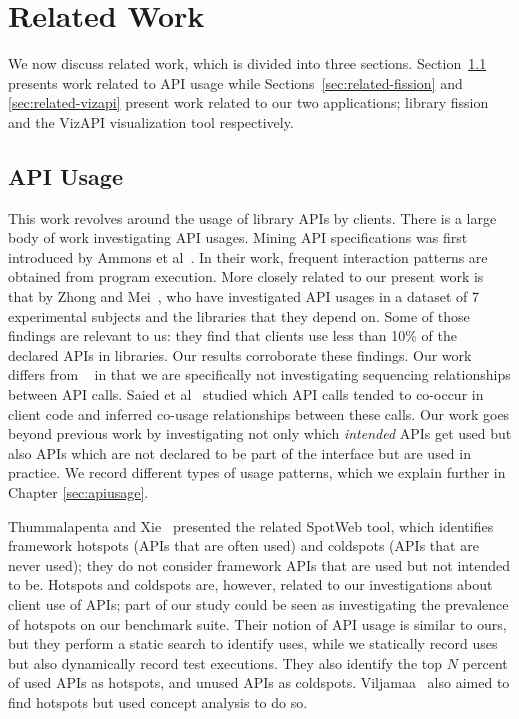 \chapter{Related Work}
\label{sec:related}
We now discuss related work, which is divided into three sections. Section~\ref{sec:related-api} presents work related to API usage while Sections~\ref{sec:related-fission} and \ref{sec:related-vizapi} present work related to our two applications; library fission and the VizAPI visualization tool respectively.

\section{API Usage}
\label{sec:related-api}
This work revolves around the usage of library APIs by clients. There is a large body of work investigating API usages. Mining API specifications was first introduced by Ammons et al~\cite{AmmonsETAL02MiningSpecifications}. In their work, frequent interaction patterns are obtained from program execution. More closely related to our present work is that by Zhong and Mei~\cite{zhong19:_empir_study_api_usages}, who have investigated API usages in a dataset of 7 experimental subjects and the libraries that they depend on. Some of those findings are relevant to us: they find that clients use less than 10\% of the declared APIs in libraries. Our results corroborate these findings. Our work differs from ~\cite{zhong19:_empir_study_api_usages} in that we are specifically not investigating sequencing relationships between API calls. Saied et al~\cite{saied15:_minin_multi_api_usage_patter} studied which API calls tended to co-occur in client code and inferred co-usage relationships between these calls. Our work goes beyond previous work by investigating not only which \emph{intended} APIs get used but also APIs which are not declared to be part of the interface but are used in practice. We record different types of usage patterns, which we explain further in Chapter \ref{sec:apiusage}.

Thummalapenta and Xie~\cite{thummalapenta08:_spotw} presented the related SpotWeb tool, which identifies framework hotspots (APIs that are often used) and coldspots (APIs that are never used); they do not consider framework APIs that are used but not intended to be. Hotspots and coldspots are, however, related to our investigations about client use of APIs; part of our study could be seen as investigating the prevalence of hotspots on our benchmark suite. Their notion of API usage is similar to ours, but they perform a static search to identify uses, while we statically record uses but also dynamically record test executions. They also identify the top $N$ percent of used APIs as hotspots, and unused APIs as coldspots. Viljamaa~\cite{viljamaa03:_rever_engin_framew_reuse_inter} also aimed to find hotspots but used concept analysis to do so.

